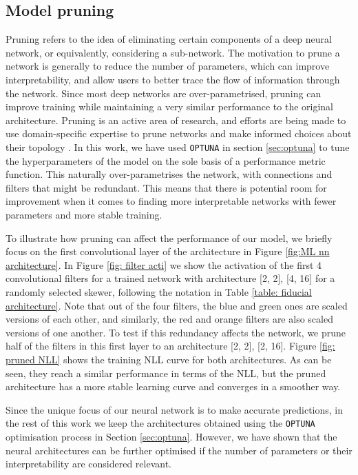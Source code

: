 \subsection{Model pruning}
Pruning refers to the idea of eliminating certain components of a deep neural network, or equivalently, considering a sub-network. The motivation to prune a network is generally to reduce the number of parameters, which can improve interpretability, and allow users to better trace the flow of information through the network. Since most deep networks are over-parametrised, pruning can improve training while maintaining a very similar performance to the original architecture. Pruning is an active area of research, and efforts are being made to use domain-specific expertise to prune networks and make informed choices about their topology \cite{pruning}. In this work, we have used \texttt{OPTUNA} in section \ref{sec:optuna} to tune the hyperparameters of the model on the sole basis of a performance metric function. This naturally over-parametrises the network, with connections and filters that might be redundant. This means that there is potential room for improvement when it comes to finding more interpretable networks with fewer parameters and more stable training.

To illustrate how pruning can affect the performance of our model, we briefly focus on the first convolutional layer of the architecture in Figure \ref{fig:ML nn architecture}. In Figure \ref{fig: filter acti} we show the activation of the first 4 convolutional filters for a trained network with architecture [2, 2], [4, 16] for a randomly selected skewer, following the notation in Table \ref{table: fiducial architecture}. Note that out of the four filters, the blue and green ones are scaled versions of each other, and similarly, the red and orange filters are also scaled versions of one another. To test if this redundancy affects the network, we prune half of the filters in this first layer to an architecture [2, 2], [2, 16]. Figure \ref{fig: pruned NLL} shows the training NLL curve for both architectures. As can be seen, they reach a similar performance in terms of the NLL, but the pruned architecture has a more stable learning curve and converges in a smoother way.

Since the unique focus of our neural network is to make accurate predictions, in the rest of this work we keep the architectures obtained using the \texttt{OPTUNA} optimisation process in Section \ref{sec:optuna}. However, we have shown that the neural architectures can be further optimised if the number of parameters or their interpretability are considered relevant.

